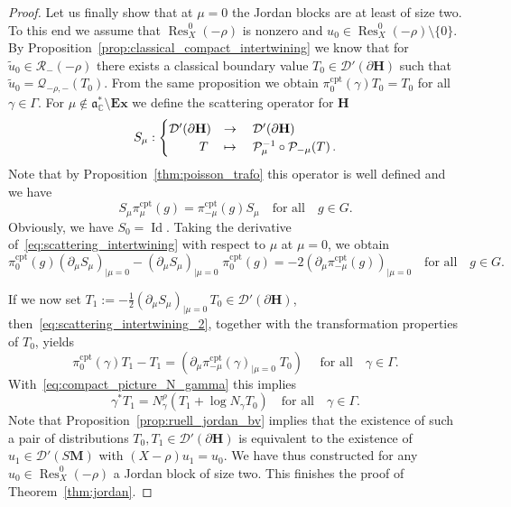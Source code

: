 \documentclass[AHL, Unicode, longabstracts, published]{cedram}
\DeclareMathOperator{\Res}{Res}
\DeclareMathOperator{\cpt}{cpt}
\DeclareMathOperator{\Id}{Id}
\newcommand{\mc}{\mathcal}
\newcommand{\cc}{\mathbb{C}}
\newcommand{\bfh}{\mathbf{H}}
\newcommand{\bfm}{\mathbf{M}}
\newcommand{\pl}{\partial}
\newcommand{\til}{\widetilde}
\renewcommand{\a}{\mathfrak a}
\begin{document}
\begin{proof}
Let us finally show that at $\mu=0$ the Jordan blocks are at least of size two. To this end we assume that $\Res_{X}^0(-\rho)$ is nonzero and $u_0\in \Res_{X}^0(-\rho)\setminus\{0\}$. By Proposition~\ref{prop:classical_compact_intertwining} we know that for $\til u_0 \in \mc{R}_-(-\rho)$ there exists a classical boundary value $T_0\in \mathcal D'(\pl {\bfh})$ such that $\til u_0 = \mathcal Q_{-\rho, -} (T_0)$. From the same proposition we obtain $\pi_0^{\cpt}(\gamma) T_0 =T_0$ for all $\gamma\in \Gamma$. For $\mu\notin \a^*_\cc\setminus \mathbf{Ex}$ we define the scattering operator for ${\bfh}$
\begin{equation}\label{eq:scattering_operator}
S_\mu:
\begin{cases}
\mathcal D'(\pl{\bfh}) &\rightarrow\quad\mathcal D'(\pl{\bfh})\\
\mkern 43 mu T & \mapsto\quad\mathcal P_{\mu}^{-1}\circ \mathcal P_{-\mu}(T)\,.
\end{cases}
\end{equation}
Note that by Proposition~\ref{thm:poisson_trafo} this operator is well defined and we have
\begin{equation}\label{eq:scattering_intertwining}
S_\mu\pi_\mu^{\cpt}(g) = \pi_{-\mu}^{\cpt}(g) S_\mu \quad\text{for all}\quad g\in G.
\end{equation}
Obviously, we have $S_0 = \Id$. Taking the derivative of~\eqref{eq:scattering_intertwining} with respect to $\mu$ at $\mu=0$, we obtain
\begin{equation}\label{eq:scattering_intertwining_2}
\pi_0^{\cpt}(g) (\partial_\mu S_\mu)_{|\mu=0} - (\partial_\mu S_\mu)_{|\mu=0}\;\pi_0^{\cpt}(g) = -2\left(\partial_\mu \pi_{-\mu}^{\cpt}(g)\right)_{|\mu=0}\quad\text{for all}\quad g\in G.
\end{equation}

\goodbreak
If we now set $T_1 :=-\tfrac{1}{2}(\partial_\mu S_\mu)_{|\mu=0}\,T_0 \in \mathcal D'(\pl{\bfh})$, then~\eqref{eq:scattering_intertwining_2}, together with the transformation properties of $T_0$, yields
\[
\pi_0^{\cpt}(\gamma)T_1-T_1 = \left(\partial_\mu \pi^{\cpt}_{-\mu}(\gamma)_{|\mu=0}\;T_0\right)\quad\text{ for all}\quad \gamma\in \Gamma.
\]
With~\eqref{eq:compact_picture_N_gamma} this implies
\[
\gamma^* T_1 = N_\gamma^\rho(T_1+\log N_\gamma T_0)\quad \text{for all}\quad\gamma\in \Gamma.
\]
Note that Proposition~\ref{prop:ruell_jordan_bv} implies that the existence of such a pair of distributions $T_0, T_1\in \mathcal D'(\pl{\bfh})$ is equivalent to the existence of $u_1\in \mathcal D'(S{\bfm})$ with $(X -\rho)u_1=u_0$. We have thus constructed for any $u_0\in \Res^0_{X}(-\rho)$ a Jordan block of size two. This finishes the proof of Theorem~\ref{thm:jordan}.
\end{proof}
\end{document}
